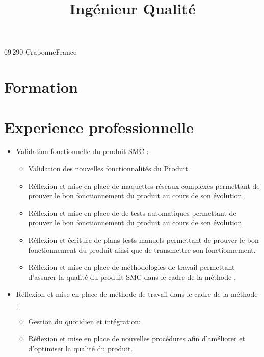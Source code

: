 

\title{Ingénieur Qualité} 
\address{57, place des mimosas}{69\,290 Craponne}{France}


\makecvtitle
\section{Formation}
\section{Experience professionnelle}
		{
			\begin{itemize}
			\item Validation fonctionnelle du produit SMC :
				\begin{itemize}
				\item Validation des nouvelles fonctionnalités du Produit.
				\item Réflexion et mise en place de maquettes réseaux complexes permettant de prouver le bon fonctionnement du produit au cours de son évolution.
				\item Réflexion et mise en place de de tests automatiques permettant de prouver le bon fonctionnement du produit au cours de son évolution.
				\item Réflexion et écriture de plans tests manuels permettant de prouver le bon fonctionnement du produit ainsi que de transmettre son fonctionnement.
				\item Réflexion et mise en place de méthodologies de travail permettant d'assurer la qualité du produit SMC dans le cadre de la méthode .
				\end{itemize}
			\end{itemize}
			\begin{itemize}
			\item Réflexion et mise en place de méthode de travail dans le cadre de la méthode :
				\begin{itemize}
				\item Gestion du quotidien et intégration: 
				\item Réflexion et mise en place de nouvelles procédures afin d'améliorer et d'optimiser la qualité du produit.
				\end{itemize}
			\end{itemize}
		}
